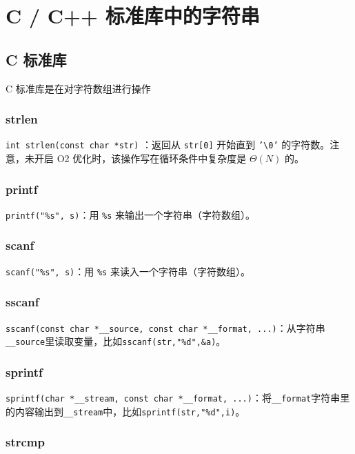 
\section{C / C++ 标准库中的字符串}

\subsection{C 标准库}

C 标准库是在对字符数组进行操作

\subsubsection{strlen}

\texttt{int strlen(const char *str)} ：返回从 \texttt{str[0]} 开始直到 \texttt{'\textbackslash{}0'} 的字符数。注意，未开启 O2 优化时，该操作写在循环条件中复杂度是 $\Theta(N)$ 的。

\subsubsection{printf}

\texttt{printf("\%s", s)}：用 \texttt{\%s} 来输出一个字符串（字符数组）。

\subsubsection{scanf}

\texttt{scanf("\%s", s)}：用 \texttt{\%s} 来读入一个字符串（字符数组）。

\subsubsection{sscanf}

\texttt{sscanf(const char *\_\_source, const char *\_\_format, ...)}：从字符串\texttt{\_\_source}里读取变量，比如\texttt{sscanf(str,"\%d",\&a)}。

\subsubsection{sprintf}

\texttt{sprintf(char *\_\_stream, const char *\_\_format, ...)}：将\texttt{\_\_format}字符串里的内容输出到\texttt{\_\_stream}中，比如\texttt{sprintf(str,"\%d",i)}。

\subsubsection{strcmp}

